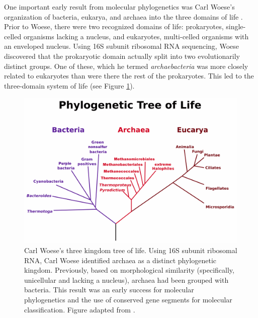 
One important early result from molecular phylogenetics was Carl Woese's organization of bacteria, eukarya, and archaea into the three domains of life \cite{Woese:1977vd}.
Prior to Woese, there were two recognized domains of life: prokaryotes, single-celled organisms lacking a nucleus, and eukaryotes, multi-celled organisms with an enveloped nucleus.
Using 16S subunit ribosomal RNA sequencing, Woese discovered that the prokaryotic domain actually split into two evolutionarily distinct groups.
One of these, which he termed \emph{archaebacteria} was more closely related to eukaryotes than were there the rest of the prokaryotes.
This led to the three-domain system of life (see Figure \ref{fig:woese_tree}).

\begin{figure}
\centering
\includegraphics[width=.7\columnwidth]{./fig/introduction/woese_tree.png}
\caption[Carl Woese's Three Kingdom Tree of Life]{Carl Woese's three kingdom tree of life. Using 16S subunit ribosomal RNA, Carl Woese identified archaea as a distinct phylogenetic kingdom. Previously, based on morphological similarity (specifically, unicellular and lacking a nucleus), archaea had been grouped with bacteria. This result was an early success for molecular phylogenetics and the use of conserved gene segments for molecular classification. Figure adapted from \cite{Woese:1990uc}.}
\label{fig:woese_tree}
\end{figure}

